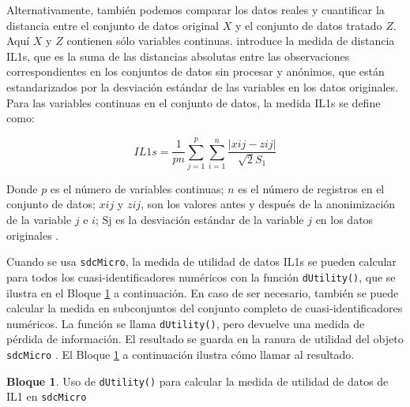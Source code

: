 \documentclass[
]{book}
\theoremstyle{definition}
\theoremstyle{definition}
\newtheorem{example}{Bloque}[chapter]
\theoremstyle{definition}
\theoremstyle{definition}
\theoremstyle{remark}
\begin{document}
Alternativamente, también podemos comparar los datos reales y cuantificar la distancia entre el conjunto de datos original \(X\) y el conjunto de datos tratado \(Z\). Aquí \(X\) y \(Z\) contienen sólo variables continuas. \citep{yancey2002} introduce la medida de distancia IL1s, que es la suma de las distancias absolutas entre las observaciones correspondientes en los conjuntos de datos sin procesar y anónimos, que están estandarizados por la desviación estándar de las variables en los datos originales. Para las variables continuas en el conjunto de datos,
la medida IL1s se define como:

\[IL1s=\frac{1}{pn}\sum_{j=1}^{p} \sum_{i=1}^{n} \frac{|xij−zij|} {\sqrt2S_1} \]

Donde \(p\) es el número de variables continuas; \(n\) es el número de registros en el conjunto de datos; \(xij\) y \(zij\), son los valores antes y después de la anonimización de la variable \(j\) e \(i\); Sj es la desviación estándar de la variable \(j\) en los datos originales \citep{yancey2002}.

Cuando se usa \texttt{sdcMicro}, la medida de utilidad de datos IL1s se pueden calcular para todos los cuasi-identificadores numéricos con la función \texttt{dUtility()}, que se ilustra en el Bloque \ref{exm:bloque7lbn} a
continuación. En caso de ser necesario, también se puede calcular la medida en subconjuntos del conjunto completo de cuasi-identificadores numéricos. La función se llama \texttt{dUtility()}, pero devuelve una medida de pérdida de información. El resultado se guarda en la ranura de utilidad del objeto \texttt{sdcMicro} . El Bloque \ref{exm:bloque7lbn} a continuación ilustra cómo llamar al resultado.

\begin{example}
\protect\hypertarget{exm:bloque7lbn}{}\label{exm:bloque7lbn}Uso de \texttt{dUtility()} para calcular la medida de utilidad de datos de IL1 en \texttt{sdcMicro}
\end{example}
\end{document}
